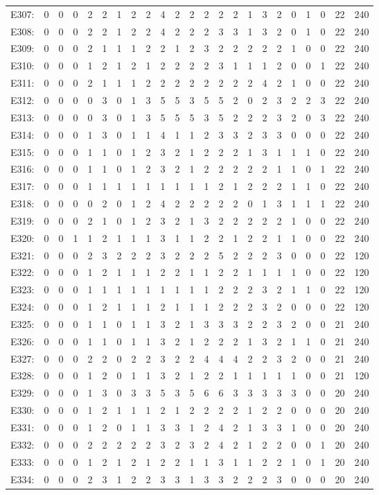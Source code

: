 \documentclass[12pt]{article}
\begin{document}
\begin{center}
\begin{tabular}{ccccccccccccccccccccc|c|c}
E307:&0&0&0&2&2&1&2&2&4&2&2&2&2&2&1&3&2&0&1&0&22&240\\
E308:&0&0&0&2&2&1&2&2&4&2&2&2&3&3&1&3&2&0&1&0&22&240\\
E309:&0&0&0&2&1&1&1&2&2&1&2&3&2&2&2&2&2&1&0&0&22&240\\
E310:&0&0&0&1&2&1&2&1&2&2&2&2&3&1&1&1&2&0&0&1&22&240\\
E311:&0&0&0&2&1&1&1&2&2&2&2&2&2&2&2&4&2&1&0&0&22&240\\
E312:&0&0&0&0&3&0&1&3&5&5&3&5&5&2&0&2&3&2&2&3&22&240\\
E313:&0&0&0&0&3&0&1&3&5&5&5&3&5&2&2&2&3&2&0&3&22&240\\
E314:&0&0&0&1&3&0&1&1&4&1&1&2&3&3&2&3&3&0&0&0&22&240\\
E315:&0&0&0&1&1&0&1&2&3&2&1&2&2&2&1&3&1&1&1&0&22&240\\
E316:&0&0&0&1&1&0&1&2&3&2&1&2&2&2&2&2&1&1&0&1&22&240\\
E317:&0&0&0&1&1&1&1&1&1&1&1&1&2&1&2&2&2&1&1&0&22&240\\
E318:&0&0&0&0&2&0&1&2&4&2&2&2&2&2&0&1&3&1&1&1&22&240\\
E319:&0&0&0&2&1&0&1&2&3&2&1&3&2&2&2&2&2&1&0&0&22&240\\
E320:&0&0&1&1&2&1&1&1&3&1&1&2&2&1&2&2&1&1&0&0&22&240\\
E321:&0&0&0&2&3&2&2&2&3&2&2&2&5&2&2&2&3&0&0&0&22&120\\
E322:&0&0&0&1&2&1&1&1&2&2&1&1&2&2&1&1&1&1&0&0&22&120\\
E323:&0&0&0&1&1&1&1&1&1&1&1&1&2&2&2&3&2&1&1&0&22&120\\
E324:&0&0&0&1&2&1&1&1&2&1&1&1&2&2&2&3&2&0&0&0&22&120\\
E325:&0&0&0&1&1&0&1&1&3&2&1&3&3&3&2&2&3&2&0&0&21&240\\
E326:&0&0&0&1&1&0&1&1&3&2&1&2&2&2&1&3&2&1&1&0&21&240\\
E327:&0&0&0&2&2&0&2&2&3&2&2&4&4&4&2&2&3&2&0&0&21&240\\
E328:&0&0&0&1&2&0&1&1&3&2&1&2&2&1&1&1&1&1&0&0&21&120\\
E329:&0&0&0&1&3&0&3&3&5&3&5&6&6&3&3&3&3&3&0&0&20&240\\
E330:&0&0&0&1&2&1&1&1&2&1&2&2&2&2&1&2&2&0&0&0&20&240\\
E331:&0&0&0&1&2&0&1&1&3&3&1&2&4&2&1&3&3&1&0&0&20&240\\
E332:&0&0&0&2&2&2&2&2&3&2&3&2&4&2&1&2&2&0&0&1&20&240\\
E333:&0&0&0&1&2&1&2&1&2&2&1&1&3&1&1&2&2&1&0&1&20&240\\
E334:&0&0&0&2&3&1&2&2&3&3&1&3&3&2&2&2&3&0&0&0&20&240\\

\end{tabular}
\end{center}
\end{document}
